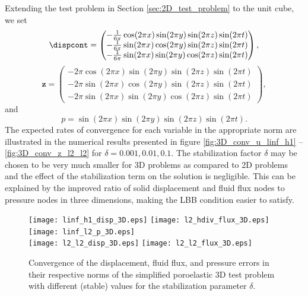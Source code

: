 Extending the test problem in Section \ref{sec:2D_test_problem} to the unit cube, we set
\begin{equation*}
 \dispcont = \begin{pmatrix}
 -\frac{1}{6\pi}\cos(2\pi x)\sin(2\pi y)\sin(2\pi z)\sin(2\pi t)  \\
 -\frac{1}{6\pi}\sin(2\pi x)\cos(2\pi y)\sin(2\pi z)\sin(2\pi t)  \\
  -\frac{1}{6\pi}\sin(2\pi x)\sin(2\pi y)\cos(2\pi z)\sin(2\pi t)
 \end{pmatrix},
\end{equation*}
\begin{equation*}
 \mathbf{z} =\begin{pmatrix}
 -2\pi\cos(2\pi x)\sin(2\pi y)\sin(2\pi z)\sin(2\pi t)  \\
 -2\pi\sin(2\pi x)\cos(2\pi y)\sin(2\pi z)\sin(2\pi t)  \\
 -2\pi\sin(2\pi x)\sin(2\pi y)\cos(2\pi z)\sin(2\pi t)
 \end{pmatrix},
\end{equation*}
and
\begin{equation*}
p=\sin(2\pi x)\sin(2\pi y)\sin(2\pi z)\sin(2\pi t).
\end{equation*}
The expected rates of convergence for each variable in the appropriate norm are illustrated in the numerical results presented in figure \ref{fig:3D_conv_u_linf_h1} --  \ref{fig:3D_conv_z_l2_l2} for $\delta=0.001,0.01,0.1$.  The stabilization factor $\delta$ may be chosen to be very much smaller for 3D problems as compared to 2D problems and the effect of the stabilization term on the solution is negligible. This can be explained by the improved ratio of solid displacement and fluid flux nodes to pressure nodes in three dimensions, making the LBB condition easier to satisfy.

\begin{figure}[h]
\begin{center}
  \subfloat[]{\label{fig:3D_conv_u_linf_h1}}  {\texttt{[image: linf\_h1\_disp\_3D.eps]}}
  \subfloat[]{\label{fig:3D_conv_divz_l2_l2}} {\texttt{[image: l2\_hdiv\_flux\_3D.eps]}}
  \subfloat[]{\label{fig:3D_conv_p_linf_l2}}  {\texttt{[image: linf\_l2\_p\_3D.eps]}}    \\
  \subfloat[]{\label{fig:3D_conv_u_l2_l2}}    {\texttt{[image: l2\_l2\_disp\_3D.eps]}}
  \subfloat[]{\label{fig:3D_conv_z_l2_l2}}    {\texttt{[image: l2\_l2\_flux\_3D.eps]}}
\caption{Convergence of the displacement, fluid flux, and pressure errors in their respective norms of the simplified poroelastic 3D test problem with different (stable) values for the stabilization parameter $ \delta$.}
\end{center}
\end{figure}



